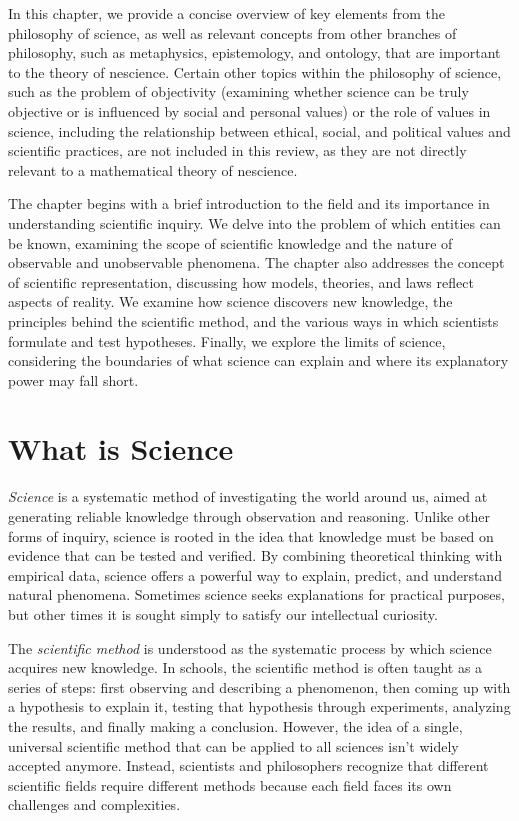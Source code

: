 In this chapter, we provide a concise overview of key elements from the philosophy of science, as well as relevant concepts from other branches of philosophy, such as metaphysics, epistemology, and ontology, that are important to the theory of nescience. Certain other topics within the philosophy of science, such as the problem of objectivity (examining whether science can be truly objective or is influenced by social and personal values) or the role of values in science, including the relationship between ethical, social, and political values and scientific practices, are not included in this review, as they are not directly relevant to a mathematical theory of nescience.

The chapter begins with a brief introduction to the field and its importance in understanding scientific inquiry. We delve into the problem of which entities can be known, examining the scope of scientific knowledge and the nature of observable and unobservable phenomena. The chapter also addresses the concept of scientific representation, discussing how models, theories, and laws reflect aspects of reality. We examine how science discovers new knowledge, the principles behind the scientific method, and the various ways in which scientists formulate and test hypotheses. Finally, we explore the limits of science, considering the boundaries of what science can explain and where its explanatory power may fall short. 


%
%

\section{What is Science}

\emph{Science} is a systematic method of investigating the world around us, aimed at generating reliable knowledge through observation and reasoning. Unlike other forms of inquiry, science is rooted in the idea that knowledge must be based on evidence that can be tested and verified. By combining theoretical thinking with empirical data, science offers a powerful way to explain, predict, and understand natural phenomena. Sometimes science seeks explanations for practical purposes, but other times it is sought simply to satisfy our intellectual curiosity.

The \emph{scientific method} is understood as the systematic process by which science acquires new knowledge. In schools, the scientific method is often taught as a series of steps: first observing and describing a phenomenon, then coming up with a hypothesis to explain it, testing that hypothesis through experiments, analyzing the results, and finally making a conclusion. However, the idea of a single, universal scientific method that can be applied to all sciences isn’t widely accepted anymore. Instead, scientists and philosophers recognize that different scientific fields require different methods because each field faces its own challenges and complexities.

